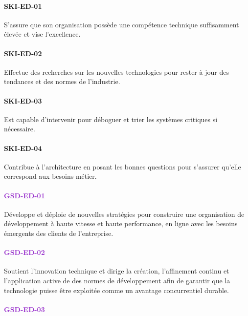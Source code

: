 \documentclass[a4paper, french, openany, 12pt]{book}
\newcommand\dex[1]{\textcolor{BrickRed}{\textbf{\uppercase{ski-{#1}}}}}
\newcommand\str[1]{\textcolor{DarkOrchid}{\textbf{\uppercase{gsd-{#1}}}}}
\begin{document}
\begin{multicols}{2}

  \paragraph*{\dex{ed-01}}

  S'assure que son organisation possède une compétence technique suffisamment élevée et vise l'excellence.

  \paragraph*{\dex{ed-02}}

  Effectue des recherches sur les nouvelles technologies pour rester à jour des tendances et des normes de l'industrie.

  \paragraph*{\dex{ed-03}}

  Est capable d'intervenir pour déboguer et trier les systèmes critiques si nécessaire.

  \paragraph*{\dex{ed-04}}

  Contribue à l'architecture en posant les bonnes questions pour s'assurer qu'elle correspond aux besoins métier.

  \paragraph*{\str{ed-01}}

  Développe et déploie de nouvelles stratégies pour construire une organisation de développement à haute vitesse et haute 
  performance, en ligne avec les besoins émergents des clients de l'entreprise.

  \paragraph*{\str{ed-02}}

  Soutient l'innovation technique et dirige la création, l'affinement continu et l'application active de des normes de 
  développement afin de garantir que la technologie puisse être exploitée comme un avantage concurrentiel durable.

  \paragraph*{\str{ed-03}}


\end{multicols}
\end{document}
